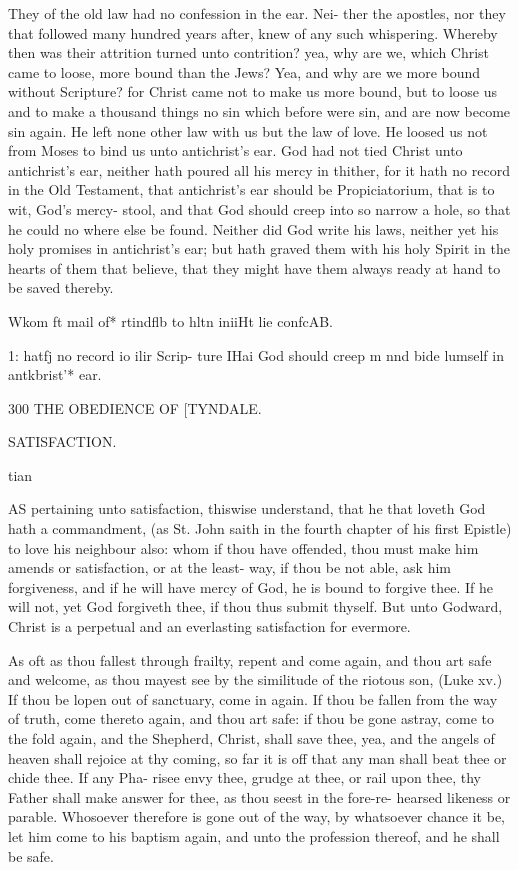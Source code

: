 \documentclass{custom}
\begin{document}
{They of the old law had no confession in the ear. Nei- 
ther the apostles, nor they that followed many hundred years 
after, knew of any such whispering. Whereby then was their 
attrition turned unto contrition? yea, why are we, which 
Christ came to loose, more bound than the Jews? Yea, 
and why are we more bound without Scripture? for Christ 
came not to make us more bound, but to loose us and to 
make a thousand things no sin which before were sin, and 
are now become sin again. He left none other law with us 
but the law of love. He loosed us not from Moses to bind 
us unto antichrist's ear. God had not tied Christ unto 
antichrist's ear, neither hath poured all his mercy in thither, 
for it hath no record in the Old Testament, that antichrist's 
ear should be Propiciatorium, that is to wit, God's mercy- 
stool, and that God should creep into so narrow a hole, so 
that he could no where else be found. Neither did 
God write his laws, neither yet his holy promises in 
antichrist's ear; but hath graved them with his holy Spirit 
in the hearts of them that believe, that they might have 
them always ready at hand to be saved thereby. 

Wkom ft 
mail of* 
rtindflb to 
hltn iniiHt 
lie confcAB. 

1: hatfj no 
record io 
ilir Scrip- 
ture IHai 
God should 
creep m 
nnd bide 
lumself in 
antkbrist'* 
ear. 


300
THE OBEDIENCE OF
[TYNDALE.

SATISFACTION. 

tian 

AS pertaining unto satisfaction, thiswise understand, 
that he that loveth God hath a commandment, (as 
St. John saith in the fourth chapter of his first Epistle) 
to love his neighbour also: whom if thou have offended, 
thou must make him amends or satisfaction, or at the least- 
way, if thou be not able, ask him forgiveness, and if he will 
have mercy of God, he is bound to forgive thee. If he will 
not, yet God forgiveth thee, if thou thus submit thyself. 
But unto Godward, Christ is a perpetual and an everlasting 
satisfaction for evermore. 

As oft as thou fallest through frailty, repent and come 
again, and thou art safe and welcome, as thou mayest 
see by the similitude of the riotous son, (Luke xv.) 
If thou be lopen out of sanctuary, come in again. If 
thou be fallen from the way of truth, come thereto again, 
and thou art safe: if thou be gone astray, come to the fold 
again, and the Shepherd, Christ, shall save thee, yea, and the 
angels of heaven shall rejoice at thy coming, so far it is off 
that any man shall beat thee or chide thee. If any Pha- 
risee envy thee, grudge at thee, or rail upon thee, thy Father 
shall make answer for thee, as thou seest in the fore-re- 
hearsed likeness or parable. Whosoever therefore is gone 
out of the way, by whatsoever chance it be, let him come 
to his baptism again, and unto the profession thereof, and 
he shall be safe. 

}
\end{document}
